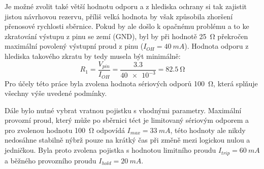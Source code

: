             Je možné zvolit také větší hodnotu odporu a z hlediska ochrany si tak zajistit jistou návrhovou rezervu, příliš velká hodnota by však způsobila zhoršení přenosové rychlosti sběrnice. Pokud by ale došlo k opačnému problému a to ke zkratování výstupu z pinu se zemí (GND), byl by při hodnotě \qty{25}{\ohm} překročen maximální povolený výstupní proud z pinu (\(I_{OH}=\qty{40}{mA}\)). Hodnota odporu z hlediska takového zkratu by tedy musela být minimálně:
            \begin{equation}
                R_{1} =\frac{V_{pin}}{I_{OH} }=\frac{\num{3.3}}{\num{40e-3}}=\qty{82.5}{\ohm}
            \end{equation}
            Pro účely této práce byla zvolena hodnota sériových odporů \qty{100}{\ohm}, která splňuje všechny výše uvedené podmínky.

            Dále bylo nutné vybrat vratnou pojistku s vhodnými parametry. Maximální provozní proud, který může po sběrnici téct je limitovaný sériovým odporem a pro zvolenou hodnotu \qty{100}{\ohm} odpovídá \(I_{max} =\qty{33}{mA}\), této hodnoty ale nikdy nedosáhne stabilně nýbrž pouze na krátký čas při změně mezi logickou nulou a jedničkou. Byla proto zvolena pojistka s hodnotou limitního proudu \(I_{trip} =\qty{60}{mA}\) a běžného provozního proudu \(I_{hold} =\qty{20}{mA}\). 

            

            